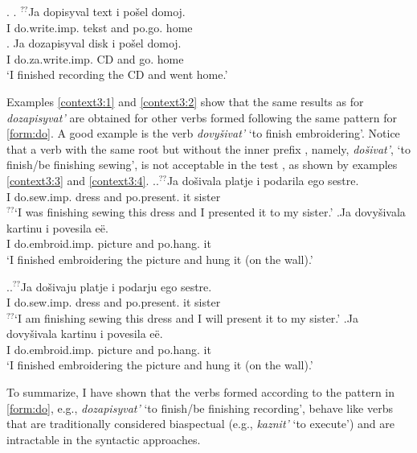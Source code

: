 \ex.\label{context2} \ag. \label{context1:2}$^{??}$Ja dopisyval text i po\v{s}el\textsuperscript{\PF} domoj.\\
{}I do.write.imp. tekst and po.go. home\\
\bg. \label{context2:2}Ja dozapisyval disk i po\v{s}el\textsuperscript{\PF} domoj.\\
I do.za.write.imp. CD and go. home\\
\trans `I finished recording the CD and went home.'

Examples \ref{context3:1} and \ref{context3:2} show that the same results as for \textit{dozapisyvat'} are obtained for other verbs formed following the same pattern for  \ref{form:do}. A good example is the verb \textit{dovy\v{s}ivat'} `to finish embroidering'. Notice that a verb with the same root but without the inner prefix , namely, \textit{do\v{s}ivat'}, `to finish/be finishing sewing', is not acceptable in the test , as shown by examples \ref{context3:3} and \ref{context3:4}.
\ex.\label{context3}\ag.\label{context3:3}$^{??}$Ja do\v{s}ivala platje i podarila\textsuperscript{\PF} ego sestre.\\
{}I do.sew.imp. dress and po.present. it sister\\
$^{??}$`I was finishing sewing this dress and I presented it to my sister.'
\bg.\label{context3:1}Ja dovy\v{s}ivala kartinu i povesila\textsuperscript{\PF} e\"e.\\
I do.embroid.imp. picture and po.hang. it\\
\trans `I finished embroidering the picture and hung it (on the wall).'

\ex.\label{context31}\ag.\label{context3:4}$^{??}$Ja do\v{s}ivaju platje i podarju\textsuperscript{\PF} ego sestre.\\
{}I do.sew.imp. dress and po.present. it sister\\
$^{??}$`I am finishing sewing this dress and I will present it to my sister.'
\bg.\label{context3:2}Ja dovy\v{s}ivala kartinu i povesila\textsuperscript{\PF} e\"e.\\
I do.embroid.imp. picture and po.hang. it\\
\trans `I finished embroidering the picture and hung it (on the wall).'

To summarize, I have shown that the verbs formed according to the pattern in \ref{form:do}, e.g., \textit{dozapisyvat'} `to finish/be finishing recording', behave like verbs that are traditionally considered biaspectual (e.g., \textit{kaznit'} `to execute') and are intractable in the syntactic approaches.

